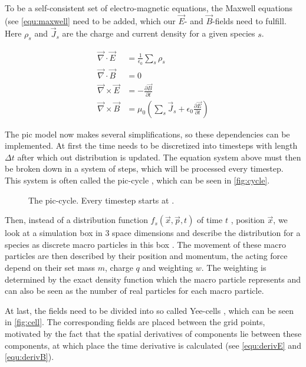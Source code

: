 \documentclass[bachelor_thesis]{subfiles}
\begin{document}
To be a self-consistent set of electro-magnetic equations, the Maxwell equations (see \autoref{equ:maxwell} need to be added, which our $\vec{E}$- and $\vec{B}$-fields need to fulfill. Here $\rho_s$ and $\vec{J}_s$ are the charge and current density for a given species $s$.

\begin{equation}
\begin{aligned}
	\vec{\nabla}\cdot\vec{E}  &= \frac{1}{\epsilon_0}\sum_s \rho_s 									\\
	\vec{\nabla}\cdot\vec{B}  &= 0 														\\
	\vec{\nabla}\times\vec{E} &= -\frac{\partial \vec{B}}{\partial t}									\\
	\vec{\nabla}\times\vec{B}&= \mu_0 \left(\sum_s \vec{J}_s + \epsilon_0 \frac{\partial \vec{E}}{\partial t}\right)	
\end{aligned}
\label{equ:maxwell}
\end{equation}

The \gls{pic} model now makes several simplifications, so these dependencies can be implemented.
At first the time needs to be discretized into timesteps with length $\Delta t$ after which out distribution is updated. The equation system above must then be broken down in a system of steps, which will be processed every timestep.
This system is often called the \gls{pic}-cycle \cite{Huebl2019}, which can be seen in \autoref{fig:cycle}.

\begin{figure}
	\centering
	\missingfigure{}
	\caption{The \gls{pic}-cycle. Every timestep starts at .}
	\label{fig:cycle}
\end{figure}

Then, instead of a distribution function $f_s(\vec{x}, \vec{p}, t)$ of time $t$ , position $\vec{x}$, we look at a simulation box in 3 space dimensions and describe the distribution for a species as discrete macro particles in this box \cite{Burau2010}.
The movement of these macro particles are then described by their position and momentum, the acting force depend on their set mass $m$, charge $q$ and weighting $w$.
The weighting is determined by the exact density function which the macro particle represents and can also be seen as the number of real particles for each macro particle.


At last, the fields need to be divided into so called Yee-cells \cite{Yee1966}, which can be seen in \autoref{fig:cell}. The corresponding fields are placed between the grid points, motivated by the fact that the spatial derivatives of components lie between these components, 
at which place the time derivative is calculated (see \autoref{equ:derivE} and \autoref{equ:derivB}).
\end{document}
